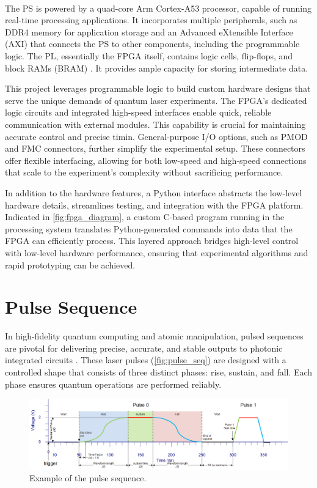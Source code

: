 The PS is powered by a quad-core Arm\textsuperscript{\textregistered} Cortex\textsuperscript{\textregistered}-A53 processor, capable of running real-time processing applications. It incorporates multiple peripherals, such as DDR4 memory for application storage and an Advanced eXtensible Interface (AXI) that connects the PS to other components, including the programmable logic. The PL, essentially the FPGA itself, contains logic cells, flip-flops, and block RAMs (BRAM) \cite{XilinxUG1182}. It provides ample capacity for storing intermediate data.

This project leverages programmable logic to build custom hardware designs that serve the unique demands of quantum laser experiments. The FPGA's dedicated logic circuits and integrated high-speed interfaces enable quick, reliable communication with external modules. This capability is crucial for maintaining accurate control and precise timin. General-purpose I/O options, such as PMOD and FMC connectors, further simplify the experimental setup. These connectors offer flexible interfacing, allowing for both low-speed and high-speed connections that scale to the experiment's complexity without sacrificing performance.

In addition to the hardware features, a Python interface abstracts the low-level hardware details, streamlines testing, and integration with the FPGA platform. Indicated in \autoref{fig:fpga_diagram}, a custom C-based program running in the processing system translates Python-generated commands into data that the FPGA can efficiently process. This layered approach bridges high-level control with low-level hardware performance, ensuring that experimental algorithms and rapid prototyping can be achieved.

\section{Pulse Sequence}

In high-fidelity quantum computing and atomic manipulation, pulsed sequences are pivotal for delivering precise, accurate, and stable outputs to photonic integrated circuits \cite{apic}. These laser pulses (\autoref{fig:pulse_seq}) are designed with a controlled shape that consists of three distinct phases: rise, sustain, and fall. Each phase ensures quantum operations are performed reliably.

\begin{figure}[h]
    \centering
    \includegraphics[width=1\linewidth]{figures/2.1.png}
    \caption{Example of the pulse sequence.}
    \label{fig:pulse_seq}
\end{figure}

